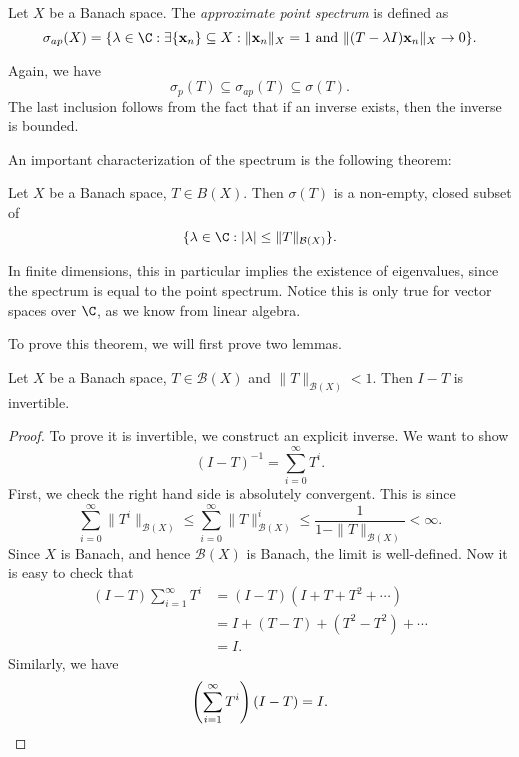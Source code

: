 \documentclass[a4paper]{article}
\begin{document}
\begin{defi}
  Let $X$ be a Banach space. The \emph{approximate point spectrum} is defined as
  \[
    \sigma_{ap}(X) = \{ \lambda \in \C: \exists \{\mathbf{x}_n\} \subseteq X: \|\mathbf{x}_n\|_X = 1\text{ and }\|(T - \lambda I)\mathbf{x}_n\|_X \to 0\}.
  \]
\end{defi}
Again, we have
\[
  \sigma_p(T) \subseteq \sigma_{ap}(T) \subseteq \sigma(T).
\]
The last inclusion follows from the fact that if an inverse exists, then the inverse is bounded.

An important characterization of the spectrum is the following theorem:
\begin{thm}
  Let $X$ be a Banach space, $T \in B(X)$. Then $\sigma(T)$ is a non-empty, closed subset of
  \[
    \{\lambda \in \C: |\lambda| \leq \|T\|_{\mathcal{B}(X)}\}.
  \]
\end{thm}
In finite dimensions, this in particular implies the existence of eigenvalues, since the spectrum is equal to the point spectrum. Notice this is only true for vector spaces over $\C$, as we know from linear algebra.

To prove this theorem, we will first prove two lemmas.
\begin{lemma}
  Let $X$ be a Banach space, $T \in \mathcal{B}(X)$ and $\|T\|_{\mathcal{B}(X)} < 1$. Then $I - T$ is invertible.
\end{lemma}

\begin{proof}
  To prove it is invertible, we construct an explicit inverse. We want to show
  \[
    (I - T)^{-1} = \sum_{i = 0}^\infty T^i.
  \]
  First, we check the right hand side is absolutely convergent. This is since
  \[
    \sum_{i = 0}^\infty \|T^i\|_{\mathcal{B}(X)} \leq \sum_{i = 0}^\infty \|T\|_{\mathcal{B}(X)}^i \leq \frac{1}{1 - \|T\|_{\mathcal{B}(X)}} < \infty.
  \]
  Since $X$ is Banach, and hence $\mathcal{B}(X)$ is Banach, the limit is well-defined. Now it is easy to check that
  \begin{align*}
    (I - T) \sum_{i = 1}^\infty T^i &= (I - T)(I + T + T^2 + \cdots) \\
    &= I + (T - T) + (T^2 - T^2) + \cdots \\
    &= I.
  \end{align*}
  Similarly, we have
  \[
    \left(\sum_{i = 1}^\infty T^i\right)(I - T) = I.\qedhere
  \]
\end{proof}
\end{document}
